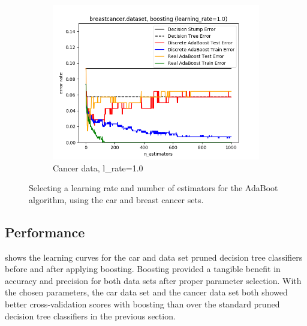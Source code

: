 \documentclass{article}
\begin{document}
\begin{figure}[htb]
\begin{subfigure}{0.33\textwidth}
      \includegraphics[width=\linewidth]{out/boosting/breastcancer-error-lrate-1.0.png}
      \caption{Cancer data, l\_rate=1.0}
      \label{fig:boosting-param-6}
    \end{subfigure}

    \caption{Selecting a learning rate and number of estimators for the AdaBoot algorithm, using the car and breast cancer sets.}
    \label{fig:boosting-param}
    \end{figure}

    \subsection{Performance}
     shows the learning curves for the car and data set pruned decision tree classifiers before and after applying boosting. Boosting provided a tangible benefit in accuracy and precision for both data sets after proper parameter selection. With the chosen parameters, the car data set and the cancer data set both showed better cross-validation scores with boosting than over the standard pruned decision tree classifiers in the previous section.
\end{document}
